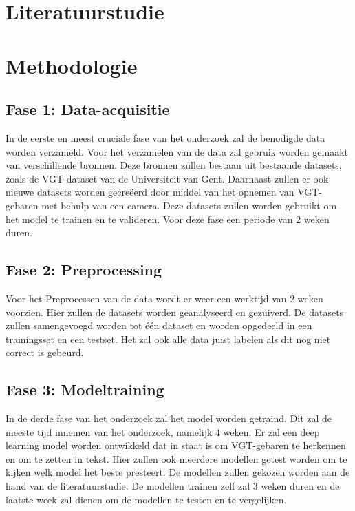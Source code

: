 \section{Literatuurstudie}%
\label{sec:literatuurstudie}


\section{Methodologie}%
\label{sec:methodologie}
\subsection{Fase 1: Data-acquisitie}
In de eerste en meest cruciale fase van het onderzoek zal de benodigde data worden verzameld.
Voor het verzamelen van de data zal gebruik worden gemaakt van verschillende bronnen.
Deze bronnen zullen bestaan uit bestaande datasets, zoals de VGT-dataset van de Universiteit van Gent.
Daarnaast zullen er ook nieuwe datasets worden gecreëerd door middel van het opnemen van VGT-gebaren met behulp van een camera.
Deze datasets zullen worden gebruikt om het model te trainen en te valideren.
Voor deze fase een periode van 2 weken duren. 
\subsection{Fase 2: Preprocessing}
Voor het Preprocessen van de data wordt er weer een werktijd van 2 weken voorzien.
Hier zullen de datasets worden geanalyseerd en gezuiverd.
De datasets zullen samengevoegd worden tot één dataset en worden opgedeeld in een trainingsset en een testset.
Het zal ook alle data juist labelen als dit nog niet correct is gebeurd.
\subsection{Fase 3: Modeltraining}
In de derde fase van het onderzoek zal het model worden getraind.
Dit zal de meeste tijd innemen van het onderzoek, namelijk 4 weken. 
Er zal een deep learning model worden ontwikkeld dat in staat is om VGT-gebaren te herkennen en om te zetten in tekst.
Hier zullen ook meerdere modellen getest worden om te kijken welk model het beste presteert.
De modellen zullen gekozen worden aan de hand van de literatuurstudie.
De modellen trainen zelf zal 3 weken duren en de laatste week zal dienen om de modellen te testen en te vergelijken.
